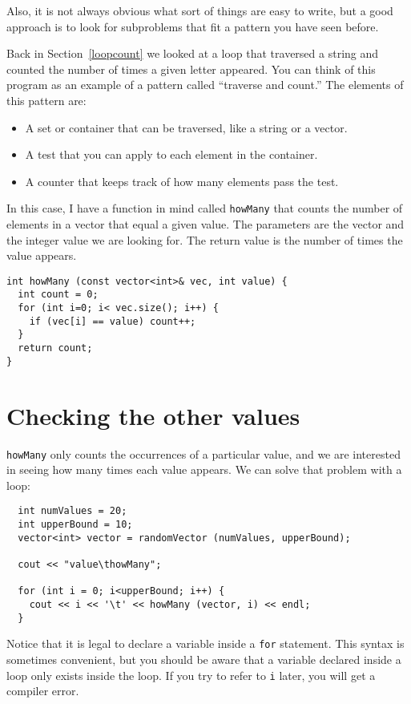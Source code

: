 
Also, it is not always obvious what sort of things are easy to write,
but a good approach is to look for subproblems that fit a pattern you
have seen before.


Back in Section~\ref{loopcount} we looked at a loop that traversed a
string and counted the number of times a given letter appeared.  You
can think of this program as an example of a pattern called ``traverse
and count.''  The elements of this pattern are:

\begin{itemize}

\item A set or container that can be traversed, like a string
or a vector.

\item A test that you can apply to each element in the container.

\item A counter that keeps track of how many elements pass
the test.

\end{itemize}

In this case, I have a function in mind called {\tt howMany} that
counts the number of elements in a vector that equal a given value.
The parameters are the vector and the integer value we are looking
for.  The return value is the number of times the value appears.

\begin{verbatim}
int howMany (const vector<int>& vec, int value) {
  int count = 0;
  for (int i=0; i< vec.size(); i++) {
    if (vec[i] == value) count++;
  }
  return count;
}
\end{verbatim}


\section{Checking the other values}

{\tt howMany} only counts the occurrences of a particular value, and
we are interested in seeing how many times each value appears.
We can solve that problem with a loop:

\begin{verbatim}
  int numValues = 20;
  int upperBound = 10;
  vector<int> vector = randomVector (numValues, upperBound);

  cout << "value\thowMany";

  for (int i = 0; i<upperBound; i++) {
    cout << i << '\t' << howMany (vector, i) << endl;
  }
\end{verbatim}
%
Notice that it is legal to declare a variable inside a {\tt for}
statement.  This syntax is sometimes convenient, but you should
be aware that a variable declared inside a loop only exists
inside the loop.  If you try to refer to {\tt i} later, you
will get a compiler error.

